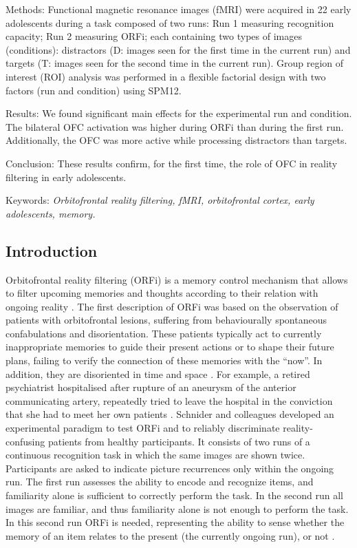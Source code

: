 Methods: Functional magnetic resonance images (fMRI) were acquired in 22 early adolescents during a task composed of two runs: Run 1 measuring recognition capacity; Run 2 measuring ORFi; each containing two types of images (conditions): distractors (D: images seen for the first time in the current run) and targets (T: images seen for the second time in the current run). Group region of interest (ROI) analysis was performed in a flexible factorial design with two factors (run and condition) using SPM12. 

Results: We found significant main effects for the experimental run and condition. The bilateral OFC activation was higher during ORFi than during the first run. Additionally, the OFC was more active while processing distractors than targets. 

Conclusion: These results confirm, for the first time, the role of OFC in reality filtering in early adolescents.

Keywords: \textit{Orbitofrontal reality filtering, fMRI, orbitofrontal cortex, early adolescents, memory.}

\subsection{Introduction}

Orbitofrontal reality filtering (ORFi) is a memory control mechanism that allows to filter upcoming memories and thoughts according to their relation with ongoing reality \citep{Schnider2013,Schnider2018}. The first description of ORFi was based on the observation of patients with orbitofrontal lesions, suffering from behaviourally spontaneous confabulations and disorientation. These patients typically act to currently inappropriate memories to guide their present actions or to shape their future plans, failing to verify the connection of these memories with the “now”. In addition, they are disoriented in time and space \citep{Schnider2018}.  For example, a retired psychiatrist hospitalised after rupture of an aneurysm of the anterior communicating artery, repeatedly tried to leave the hospital in the conviction that she had to meet her own patients \citep{Schnider2005}. 
Schnider and colleagues \citep{Schnider1996} developed an experimental paradigm to test ORFi and to reliably discriminate reality-confusing patients from healthy participants. It consists of two runs of a continuous recognition task in which the same images are shown twice. Participants are asked to indicate picture recurrences only within the ongoing run. The first run assesses the ability to encode and recognize items, and familiarity alone is sufficient to correctly perform the task. In the second run all images are familiar, and thus familiarity alone is not enough to perform the task. In this second run ORFi is needed, representing the ability to sense whether the memory of an item relates to the present (the currently ongoing run), or not \citep{Schnider1999}. 

